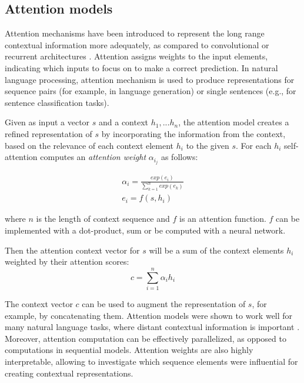 \subsection{Attention models}

Attention mechanisms have been introduced to represent the long range contextual information more adequately, as compared to convolutional or recurrent architectures \cite{bahdanau2014neural}. Attention assigns weights to the input elements, indicating which inputs to focus on to make a correct prediction. In natural language processing, attention mechanism is used to produce representations for sequence pairs (for example, in language generation) or single sentences (e.g., for sentence classification tasks).

Given as input a vector $s$ and a context $h_1, ... h_n$, the attention model creates a refined representation of $s$ by incorporating the information from the context, based on the relevance of each context element $h_i$ to the given $s$. For each $h_i$ self-attention computes an \textit{attention weight} $\alpha_i_j$ as follows:
\begin{spreadlines}{10pt} 
\begin{gather*}
    \alpha_i = \frac{exp(e_i)}{\sum_{k=1}^n exp(e_k)} \\ 
    e_i = f(s, h_i)
\end{gather*}
\end{spreadlines}

where $n$ is the length of context sequence and $f$ is an attention function. $f$ can be implemented with a dot-product, sum or be computed with a neural network.

Then the attention context vector for $s$ will be a sum of the context elements $h_i$ weighted by their attention scores:
\begin{equation}
    c = \sum_{i=1}^n \alpha_i h_i 
\end{equation}

The context vector $c$ can be used to augment the representation of $s$, for example, by concatenating them. 
Attention models were shown to work well for many natural language tasks, where distant contextual information is important \cite{bahdanau2014neural, yin2016abcnn}. Moreover, attention computation can be effectively parallelized, as opposed to computations in sequential models. Attention weights are also highly interpretable, allowing to investigate which sequence elements were influential for creating contextual representations.

